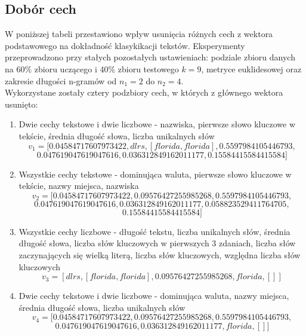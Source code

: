 \documentclass{article}
\begin{document}
\subsection{Dobór cech}
W poniższej tabeli przestawiono wpływ usunięcia różnych cech z wektora podstawowego na dokładność klasykikacji tekstów. Eksperymenty przeprowadzono przy stałych pozostałych ustawieniach: podziale zbioru danych na 60\% zbioru uczącego i 40\% zbioru testowego \(k = 9\), metryce euklidesowej oraz zakresie długości n-gramów od \(n_1 = 2\) do \(n_2 = 4\). \\
Wykorzystane zostały cztery podzbiory cech, w których z głównego wektora usunięto:
\begin{enumerate}
    \item Dwie cechy tekstowe i dwie liczbowe - nazwiska, pierwsze słowo kluczowe w tekście, średnia długość słowa, liczba unikalnych słów
    \[
    v_1 = [ 0.04584717607973422, dlrs, [ florida, florida], 0.5597984105446793, 
    \]
    \[
         0.047619047619047616, 0.036312849162011177, 0.15584415584415584 ]
    \]
    \item Wszystkie cechy tekstowe - dominująca waluta, pierwsze słowo kluczowe w tekście, nazwy miejsca, nazwiska
    \[
    v_2 = [ 0.04584717607973422, 0.09576427255985268, 0.5597984105446793, 
    \]
    \[
          0.047619047619047616, 0.036312849162011177, 0.058823529411764705, 
    \]
    \[
        0.15584415584415584 ]
    \]
    \item Wszystkie cechy liczbowe - długość tekstu, liczba unikalnych słów, średnia długość słowa, liczba słów kluczowych w pierwszych 3 zdaniach, liczba słów zaczynających się wielką literą, liczba słów kluczowych, względna liczba słów kluczowych
    \[
    v_3 = [  dlrs, [ florida, florida], 0.09576427255985268, florida, [] ]
\]
    \item Dwie cechy tekstowe i dwie liczbowe - dominująca waluta, nazwy miejsca, średnia długość słowa, liczba unikalnych słów
    \[
    v_4 = [ 0.04584717607973422, 0.09576427255985268, 0.5597984105446793, 
\]
\[
     0.047619047619047616, 0.036312849162011177, florida, [] ]
\]
\end{enumerate}
\end{document}
